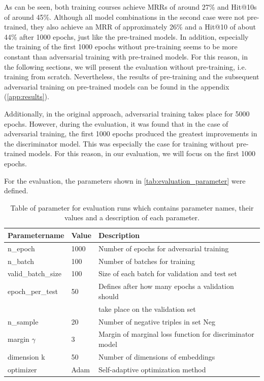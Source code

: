 As can be seen, both training courses achieve MRRs of around 27\% and Hit@10s of around 45\%.
Although all model combinations in the second case were not pre-trained, they also achieve an MRR of approximately 26\% and a Hit@10 of about 44\% after 1000 epochs, just like the pre-trained models.
In addition, especially the training of the first 1000 epochs without pre-training seems to be more constant than adversarial training with pre-trained models.
For this reason, in the following sections, we will present the evaluation without pre-training, i.e. training from scratch.
Nevertheless, the results of pre-training and the subsequent adversarial training on pre-trained models can be found in the appendix (\autoref{app:results}).

Additionally, in the original approach, adversarial training takes place for 5000 epochs.
However, during the evaluation, it was found that in the case of adversarial training, the first 1000 epochs produced the greatest improvements in the discriminator model.
This was especially the case for training without pre-trained models.
For this reason, in our evaluation, we will focus on the first 1000 epochs.

For the evaluation, the parameters shown in \autoref{tab:evaluation_parameter} were defined.
\begin{table}[h]
    \centering
    \begin{tabular}{lll}
        \toprule
        
        \textbf{Parametername} & 
        \textbf{Value} & 
        \textbf{Description} \\
    
        \midrule
         n\_epoch & 1000 & Number of epochs for adversarial training\\
         n\_batch & 100 & Number of batches for training \\
         
         valid\_batch\_size & 100 & Size of each batch for validation and test set\\
         epoch\_per\_test & 50 & Defines after how many epochs a validation should \\
         &  & take place on the validation set \\
         n\_sample & 20 & Number of negative triples in set Neg \\

        margin $\gamma$ & 3 & Margin of marginal loss function for discriminator model\\
        dimension k & 50 & Number of dimensions of embeddings \\ 
        optimizer & Adam & Self-adaptive optimization method \\

        \bottomrule
    \end{tabular}
    \caption{Table of parameter for evaluation runs which contains parameter names, their values and a description of each parameter.}
\label{tab:evaluation_parameter}
\end{table}